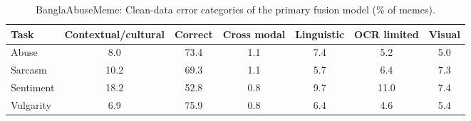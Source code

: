\begin{table}[t]
\centering
\small
\caption{BanglaAbuseMeme: Clean-data error categories of the primary fusion model (\% of memes).}
\label{tab:clean_error_table_banglaabusememe}
\begin{adjustbox}{max width=\columnwidth}
\begin{tabular}{lcccccc}
\toprule
Task & Contextual/cultural & Correct & Cross modal & Linguistic & OCR limited & Visual \\
\midrule
Abuse & 8.0 & 73.4 & 1.1 & 7.4 & 5.2 & 5.0 \\
Sarcasm & 10.2 & 69.3 & 1.1 & 5.7 & 6.4 & 7.3 \\
Sentiment & 18.2 & 52.8 & 0.8 & 9.7 & 11.0 & 7.4 \\
Vulgarity & 6.9 & 75.9 & 0.8 & 6.4 & 4.6 & 5.4 \\
\bottomrule
\end{tabular}
\end{adjustbox}
\end{table}
